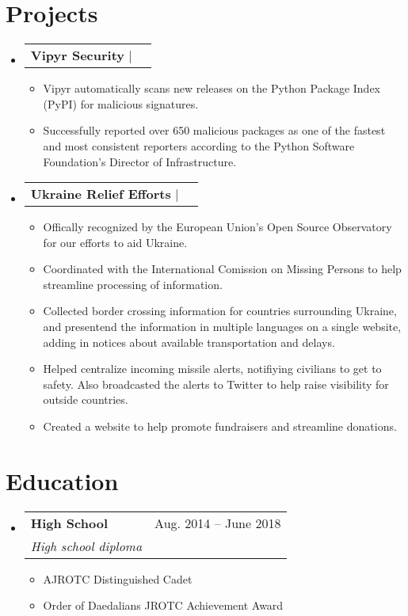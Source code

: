 \documentclass[letterpaper,11pt]{article}
\makeatletter
\let\emph\relax
\newcommand{\resumeItem}[1]{
  \item\small{
    {#1 \vspace{-2pt}}
  }
}
\newcommand{\resumeSubheading}[4]{
  \vspace{-2pt}\item
    \begin{tabular*}{0.97\textwidth}[t]{l@{\extracolsep{\fill}}r}
      \textbf{#1} & #2 \\
      \textit{\small#3} & \textit{\small #4} \\
    \end{tabular*}\vspace{-7pt}
}
\newcommand{\resumeProjectHeading}[2]{
    \item
    \begin{tabular*}{0.97\textwidth}{l@{\extracolsep{\fill}}r}
      \small#1 & #2 \\
    \end{tabular*}\vspace{-7pt}
}
\newcommand{\resumeSubheadingListStart}{\begin{itemize}[leftmargin=0.15in, label={}]}
\newcommand{\resumeSubheadingListEnd}{\end{itemize}}
\newcommand{\resumeItemListStart}{\begin{itemize}}
\newcommand{\resumeItemListEnd}{\end{itemize}}
\makeatother
\begin{document}
\section{Projects}
    \resumeSubheadingListStart
        \resumeProjectHeading{\textbf{Vipyr Security} $|$ \emph{Python, GitHub Actions, Kubernetes, Sentry}}{}
        \resumeItemListStart
            \resumeItem{Vipyr automatically scans new releases on the Python Package Index (PyPI) for malicious signatures.}
            \resumeItem{Successfully reported over 650 malicious packages as
            one of the fastest and most consistent reporters according to the
        Python Software Foundation's Director of Infrastructure.}
        \resumeItemListEnd
    \resumeSubheadingListEnd
    \resumeSubheadingListStart
        \resumeProjectHeading{\textbf{Ukraine Relief Efforts} $|$ \emph{GitHub Actions, Vercel, Sentry}}{}
        \resumeItemListStart
            \resumeItem{Offically recognized by the European Union's Open Source Observatory for 
              our efforts to aid Ukraine.}
            \resumeItem{Coordinated with the International Comission on Missing Persons to help
              streamline processing of information.}
            \resumeItem{Collected border crossing information for countries surrounding Ukraine, 
              and presentend the information in multiple languages on a single website, 
              adding in notices about available transportation and delays.}
            \resumeItem{Helped centralize incoming missile alerts, notifiying civilians to get to safety. 
              Also broadcasted the alerts to Twitter to help raise visibility for outside countries.}
            \resumeItem{Created a website to help promote fundraisers and streamline donations.}
        \resumeItemListEnd
    \resumeSubheadingListEnd

  \section{Education}
  \resumeSubheadingListStart
    \resumeSubheading{High School}{Aug. 2014 -- June 2018}{High school diploma}{}
    \resumeItemListStart
        \resumeItem{AJROTC Distinguished Cadet}
        \resumeItem{Order of Daedalians JROTC Achievement Award}
    \resumeItemListEnd
  \resumeSubheadingListEnd
\end{document}
